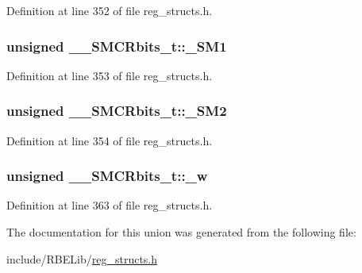 Definition at line 352 of file reg\+\_\+structs.\+h.

\hypertarget{union_____s_m_c_rbits__t_a8c57caf18c78035bd0ac83ddc64a05af}{
\subsubsection[{\+\_\+\+S\+M1}]{\setlength{\rightskip}{0pt plus 5cm}unsigned \+\_\+\+\_\+\+S\+M\+C\+Rbits\+\_\+t\+::\+\_\+\+S\+M1}}\label{union_____s_m_c_rbits__t_a8c57caf18c78035bd0ac83ddc64a05af}


Definition at line 353 of file reg\+\_\+structs.\+h.

\hypertarget{union_____s_m_c_rbits__t_a5a220849d4a6c89d4cca84222a9df5cc}{
\subsubsection[{\+\_\+\+S\+M2}]{\setlength{\rightskip}{0pt plus 5cm}unsigned \+\_\+\+\_\+\+S\+M\+C\+Rbits\+\_\+t\+::\+\_\+\+S\+M2}}\label{union_____s_m_c_rbits__t_a5a220849d4a6c89d4cca84222a9df5cc}


Definition at line 354 of file reg\+\_\+structs.\+h.

\hypertarget{union_____s_m_c_rbits__t_a715eaad7b2b47e45cacd7e59f3580c68}{
\subsubsection[{\+\_\+w}]{\setlength{\rightskip}{0pt plus 5cm}unsigned \+\_\+\+\_\+\+S\+M\+C\+Rbits\+\_\+t\+::\+\_\+w}}\label{union_____s_m_c_rbits__t_a715eaad7b2b47e45cacd7e59f3580c68}


Definition at line 363 of file reg\+\_\+structs.\+h.



The documentation for this union was generated from the following file\+:\begin{DoxyCompactItemize}
\item 
include/\+R\+B\+E\+Lib/\hyperlink{reg__structs_8h}{reg\+\_\+structs.\+h}\end{DoxyCompactItemize}
